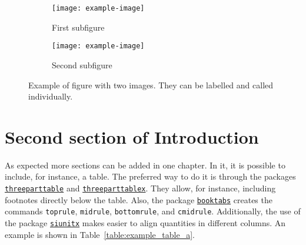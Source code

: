 \begin{figure}[tbhp]
    \centering
    \begin{subfigure}[t]{0.40\textwidth}
        \centering
        \caption{First subfigure}
        \texttt{[image: example-image]}
        \label{fig:first_subfigure}
    \end{subfigure}
    \begin{subfigure}[t]{0.40\textwidth}
        \centering
        \caption{Second subfigure}
        \texttt{[image: example-image]}
        \label{fig:second_subfigure}
    \end{subfigure}
    \caption[Example of figure with two images]{Example of figure with two images. They can be labelled and called individually.}
    \label{fig:example_subfigure}
\end{figure}

\section[\MakeUppercase{Second section of Introduction}]{Second section of Introduction}\label{sec:second_section}

As expected more sections can be added in one chapter. In it, it is possible to include, for instance, a table. The preferred way to do it is through the packages \href{https://ctan.org/pkg/threeparttable}{\texttt{threeparttable}} and \href{https://ctan.org/pkg/threeparttablex}{\texttt{threeparttablex}}. They allow, for instance, including footnotes directly below the table. Also, the package \href{https://ctan.org/pkg/booktabs}{\texttt{booktabs}} creates the commands \texttt{toprule}, \texttt{midrule}, \texttt{bottomrule}, and \texttt{cmidrule}. Additionally, the use of the package \href{https://ctan.org/pkg/siunitx}{\texttt{siunitx}} makes easier to align quantities in different columns. An example is shown in Table~\ref{table:example_table_a}.

